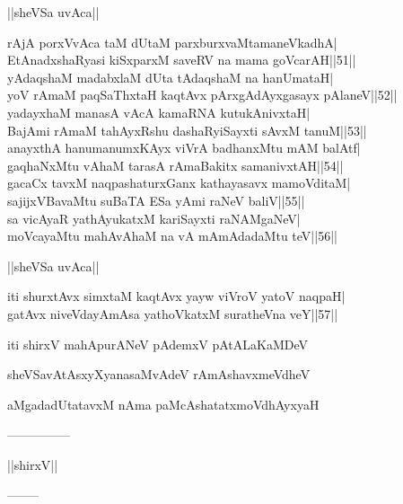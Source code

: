 \documentclass{article}
\begin{document}
\begin{center}
||sheVSa uvAca||
\end{center}

rAjA porxVvAca taM dUtaM parxburxvaMtamaneVkadhA|\\
EtAnadxshaRyasi kiSxparxM saveRV na mama goVcarAH||51||\\
yAdaqshaM madabxlaM dUta tAdaqshaM na hanUmataH|\\
yoV rAmaM paqSaThxtaH kaqtAvx pArxgAdAyxgasayx pAlaneV||52||\\
yadayxhaM manasA vAcA kamaRNA kutukAnivxtaH|\\
BajAmi rAmaM tahAyxRshu dashaRyiSayxti sAvxM tanuM||53||\\
anayxthA hanumanumxKAyx viVrA badhanxMtu mAM balAtf|\\
gaqhaNxMtu vAhaM tarasA rAmaBakitx samanivxtAH||54||\\
gacaCx tavxM naqpashaturxGanx kathayasavx mamoVditaM|\\
sajijxVBavaMtu suBaTA ESa yAmi raNeV baliV||55||\\
sa vicAyaR yathAyukatxM kariSayxti raNAMgaNeV|\\
moVcayaMtu mahAvAhaM na vA mAmAdadaMtu teV||56||\\

\begin{center}
||sheVSa uvAca||
\end{center}

iti shurxtAvx simxtaM kaqtAvx yayw viVroV yatoV naqpaH|\\
gatAvx niveVdayAmAsa yathoVkatxM suratheVna veY||57||

\begin{center}
iti shirxV mahApurANeV pAdemxV pAtALaKaMDeV
\end{center}

\begin{center}
sheVSavAtAsxyXyanasaMvAdeV rAmAshavxmeVdheV
\end{center}

\begin{center}
aMgadadUtatavxM nAma paMcAshatatxmoVdhAyxyaH
\end{center}

\begin{center}
---------------
\end{center}

\begin{center}
||shirxV||
\end{center}

\begin{center}
--------
\end{center}
\end{document}
